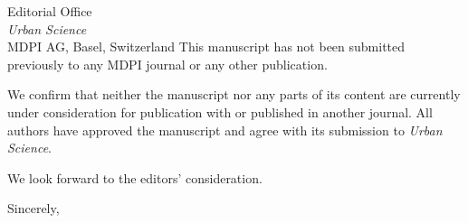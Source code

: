 \documentclass[11pt,a4paper]{letter}
\begin{document}
\begin{letter}{Editorial Office\\
\textit{Urban Science}\\
MDPI AG, Basel, Switzerland}
This manuscript has not been submitted previously to any MDPI journal or any
other publication.

We confirm that neither the manuscript nor any parts of its content are
currently under consideration for publication with or published in another
journal. All authors have approved the manuscript and agree with its submission
to \textit{Urban Science}.

We look forward to the editors' consideration.

\closing{Sincerely,}

\end{letter}
\end{document}
